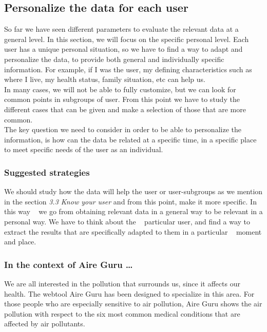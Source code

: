 \subsection{Personalize the data for each user}

So far we have seen different parameters to evaluate the relevant data at a general level. In this section, we will focus on the specific personal level.
Each user has a unique personal situation, so we have to find a way to adapt and personalize the data, to provide both general and individually specific information.
For example, if I was the user, my defining characteristics such as where I live,
my health status, family situation, etc can help us.\\

In many cases, we will not be able to fully customize, but we can look for common points in subgroups of
user. From this point we have to study the different cases that can be given and make a selection of those that are
more common.\\

The key question we need to consider in order to be able to personalize the information, is how can the data be related at a specific time, in a specific place to meet specific needs of the
user as an individual.

\subsubsection*{Suggested strategies} 

We should study how the data will help the user or user-subgroups as we mention in the section \textit{3.3 Know your user} and from this point, make it more specific. In this way
  we go from obtaining relevant data in a general way to be relevant in a personal way. We have to think about the
  particular user, and find a way to extract the results that are specifically adapted to them in a particular
  moment and place.

\subsubsection*{In the context of Aire Guru \ldots}

 We are all interested in the pollution that surrounds us, since it affects our health. The webtool
 Aire Guru has been designed to specialize in this area. For those people who are especially sensitive to air pollution, Aire Guru shows the air pollution with respect to the six most common medical conditions that
 are affected by air pollutants.
 
